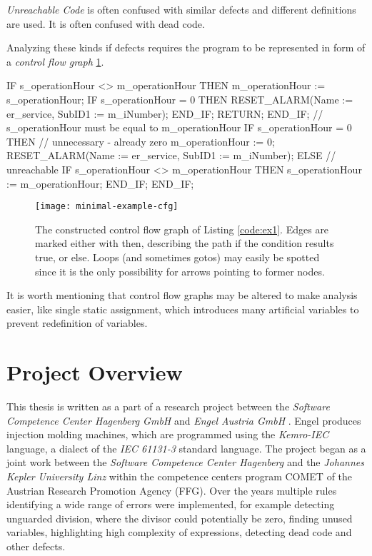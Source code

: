 \emph{Unreachable Code} is often confused with similar defects and different definitions are used.
It is often confused with dead code.

Analyzing these kinds if defects requires the program to be represented in form of a \emph{control flow graph} \ref{fig:cfg}.


\begin{program}[h!]
    \begin{GenericCode}
IF s_operationHour <> m_operationHour THEN
    m_operationHour := s_operationHour;
    IF s_operationHour = 0 THEN
        RESET_ALARM(Name := er_service, SubID1 := m_iNumber);
    END_IF;
    RETURN;
END_IF;
// s_operationHour must be equal to m_operationHour
IF s_operationHour = 0 THEN
    // unnecessary - already zero
    m_operationHour := 0;
    RESET_ALARM(Name := er_service, SubID1 := m_iNumber);
ELSE
    // unreachable
    IF s_operationHour <> m_operationHour THEN
        s_operationHour := m_operationHour;
    END_IF;
END_IF;\end{GenericCode}
    \caption{A minimal example containing unreachable code due to unsatisfiable conditions. The condition in line 15 is never reachable, since this case was already handeld in line 1 and the state of that variable did not change.}
    \label{code:ex1}
\end{program}
\begin{figure}[h!]
  \centering
  \texttt{[image: minimal-example-cfg]}
  \caption{The constructed control flow graph of Listing \ref{code:ex1}. Edges are marked either with then, describing the path if the condition results true, or else. Loops (and sometimes gotos) may easily be spotted since it is the only possibility for arrows pointing to former nodes.}
  \label{fig:cfg}
\end{figure}

It is worth mentioning that control flow graphs may be altered to make analysis easier, like single static assignment, which introduces many artificial variables to prevent redefinition of variables.

\section{Project Overview}
\label{sec:project overview}
This thesis is written as a part of a research project between the \emph{Software Competence Center Hagenberg GmbH} \cite{ScchGmbH} and \emph{Engel Austria GmbH} \cite{EngelGmbH}.
Engel produces injection molding machines, which are programmed using the \emph{Kemro-IEC} language, a dialect of the \emph{IEC 61131-3} standard language.
The project began as a joint work between the \emph{Software Competence Center Hagenberg} and the \emph{Johannes Kepler University Linz} \cite{jku, Prahofer_2012} within the competence centers program COMET of the Austrian Research Promotion Agency (FFG).
Over the years multiple rules identifying a wide range of errors were implemented, for example detecting unguarded division, where the divisor could potentially be zero, finding unused variables, highlighting high complexity of expressions, detecting dead code and other defects.
\clearpage
\pagebreak
